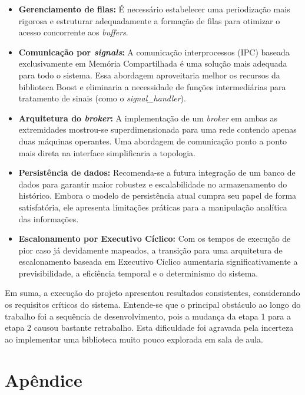 \documentclass[12pt]{article}
\begin{document}
\begin{itemize}
    \item \textbf{Gerenciamento de filas:} É necessário estabelecer uma periodização mais rigorosa e estruturar adequadamente a formação de filas para otimizar o acesso concorrente aos \textit{buffers}.
    
    \item \textbf{Comunicação por \textit{signals}:} A comunicação interprocessos (IPC) baseada exclusivamente em Memória Compartilhada é uma solução mais adequada para todo o sistema. Essa abordagem aproveitaria melhor os recursos da biblioteca Boost e eliminaria a necessidade de funções intermediárias para tratamento de sinais (como o \textit{signal\_handler}).
    
    \item \textbf{Arquitetura do \textit{broker}:} A implementação de um \textit{broker} em ambas as extremidades mostrou-se superdimensionada para uma rede contendo apenas duas máquinas operantes. Uma abordagem de comunicação ponto a ponto mais direta na interface simplificaria a topologia.
    
    \item \textbf{Persistência de dados:} Recomenda-se a futura integração de um banco de dados para garantir maior robustez e escalabilidade no armazenamento do histórico. Embora o modelo de persistência atual cumpra seu papel de forma satisfatória, ele apresenta limitações práticas para a manipulação analítica das informações.
    
    \item \textbf{Escalonamento por Executivo Cíclico:} Com os tempos de execução de pior caso já devidamente mapeados, a transição para uma arquitetura de escalonamento baseada em Executivo Cíclico aumentaria significativamente a previsibilidade, a eficiência temporal e o determinismo do sistema.
\end{itemize}

Em suma, a execução do projeto apresentou resultados consistentes, considerando os requisitos críticos do sistema. Entende-se que o principal obstáculo ao longo do trabalho foi a sequência de desenvolvimento, pois a mudança da etapa 1 para a etapa 2 causou bastante retrabalho. Esta dificuldade foi agravada pela incerteza ao implementar uma biblioteca muito pouco explorada em sala de aula.


\section{Apêndice}
\end{document}

